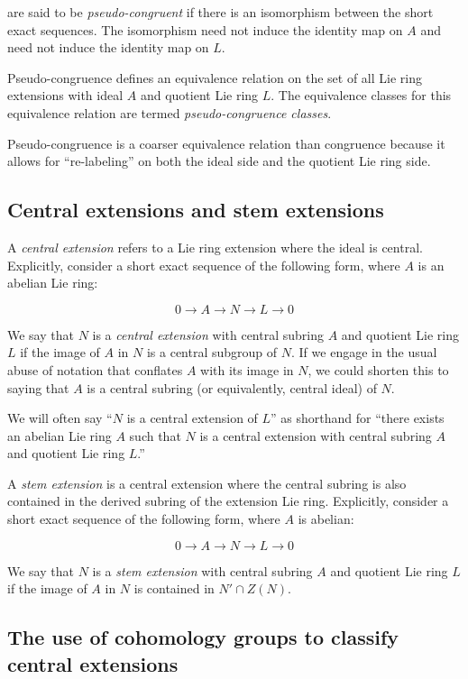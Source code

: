 \documentclass{ucetd}
\begin{document}
are said to be {\em pseudo-congruent} if there is an isomorphism
between the short exact sequences. The isomorphism need not induce the
identity map on $A$ and need not induce the identity map on $L$.

Pseudo-congruence defines an equivalence relation on the set of all
Lie ring extensions with ideal $A$ and quotient Lie ring $L$. The
equivalence classes for this equivalence relation are termed {\em
  pseudo-congruence classes}.

Pseudo-congruence is a coarser equivalence relation than congruence
because it allows for ``re-labeling'' on both the ideal side and the
quotient Lie ring side.

\subsection{Central extensions and stem extensions}\label{sec:central-and-stem-extension-lie}

A {\em central extension} refers to a Lie ring extension where the
ideal is central. Explicitly, consider a short exact sequence of
the following form, where $A$ is an abelian Lie ring:

$$0 \to A \to N \to L \to 0$$

We say that $N$ is a {\em central extension} with central subring $A$
and quotient Lie ring $L$ if the image of $A$ in $N$ is a central
subgroup of $N$. If we engage in the usual abuse of notation that
conflates $A$ with its image in $N$, we could shorten this to saying
that $A$ is a central subring (or equivalently, central ideal) of $N$.

We will often say ``$N$ is a central extension of $L$'' as shorthand
for ``there exists an abelian Lie ring $A$ such that $N$ is a central
extension with central subring $A$ and quotient Lie ring $L$.''

A {\em stem extension} is a central extension where the central
subring is also contained in the derived subring of the extension
Lie ring. Explicitly, consider a short exact sequence of the following
form, where $A$ is abelian:

$$0 \to A \to N \to L \to 0$$

We say that $N$ is a {\em stem extension} with central subring $A$
and quotient Lie ring $L$ if the image of $A$ in $N$ is contained in $N'
\cap Z(N)$.

\subsection{The use of cohomology groups to classify central extensions}\label{sec:second-cohomology-lie-ring-classify-extensions}
\end{document}
